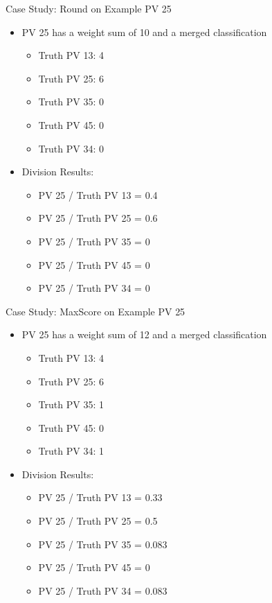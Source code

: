 \documentclass[xcolor=table,aspectratio=169]{beamer}
\begin{document}
\begin{frame}{Case Study: Round on Example PV 25}
    \begin{itemize}
        \item PV 25 has a weight sum of 10 and a merged classification
        \begin{itemize}
            \item Truth PV 13: 4
            \item Truth PV 25: 6
            \item Truth PV 35: 0
            \item Truth PV 45: 0
            \item Truth PV 34: 0
        \end{itemize}
        \item Division Results:
        \begin{itemize}
            \item PV 25 / Truth PV 13 = 0.4
            \item PV 25 / Truth PV 25 = 0.6
            \item PV 25 / Truth PV 35 = 0
            \item PV 25 / Truth PV 45 = 0
            \item PV 25 / Truth PV 34 = 0
        \end{itemize}
    \end{itemize}
\end{frame}

\begin{frame}{Case Study: MaxScore on Example PV 25}
    \begin{itemize}
        \item PV 25 has a weight sum of 12 and a merged classification
        \begin{itemize}
            \item Truth PV 13: 4
            \item Truth PV 25: 6
            \item Truth PV 35: 1
            \item Truth PV 45: 0
            \item Truth PV 34: 1
        \end{itemize}
        \item Division Results:
        \begin{itemize}
            \item PV 25 / Truth PV 13 = 0.33
            \item PV 25 / Truth PV 25 = 0.5
            \item PV 25 / Truth PV 35 = 0.083
            \item PV 25 / Truth PV 45 = 0
            \item PV 25 / Truth PV 34 = 0.083
        \end{itemize}
    \end{itemize}
\end{frame}
\end{document}
